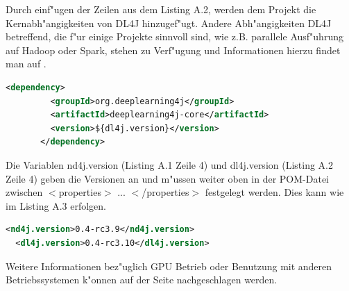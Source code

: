 {Durch einf"ugen der Zeilen aus dem Listing A.2, werden dem Projekt die Kernabh"angigkeiten von DL4J hinzugef"ugt. Andere Abh"angigkeiten DL4J betreffend, die f"ur einige Projekte sinnvoll sind, wie z.B. parallele Ausf"uhrung auf Hadoop oder Spark, stehen zu Verf"ugung und Informationen hierzu findet man auf \cite{ND4J}.
\begin{lstlisting}[language=XML,caption=applicationContext.xml]
	   <dependency>
	     <groupId>org.deeplearning4j</groupId>
	     <artifactId>deeplearning4j-core</artifactId>
	     <version>${dl4j.version}</version>
	   </dependency>
\end{lstlisting}

Die Variablen \glqq nd4j.version\grqq{} (Listing A.1 Zeile 4) und \glqq dl4j.version\grqq{} (Listing A.2 Zeile 4) geben die Versionen an und m"ussen weiter oben in der POM-Datei zwischen $<$properties$>$ ... $<$/properties$>$ festgelegt werden. Dies kann wie im Listing A.3 erfolgen.
\begin{lstlisting}[language=XML,caption=applicationContext.xml]
  <nd4j.version>0.4-rc3.9</nd4j.version>
  <dl4j.version>0.4-rc3.10</dl4j.version>
\end{lstlisting}

Weitere Informationen bez"uglich GPU Betrieb oder Benutzung mit anderen Betriebssystemen k"onnen auf der \cite{ND4J} Seite nachgeschlagen werden.
}